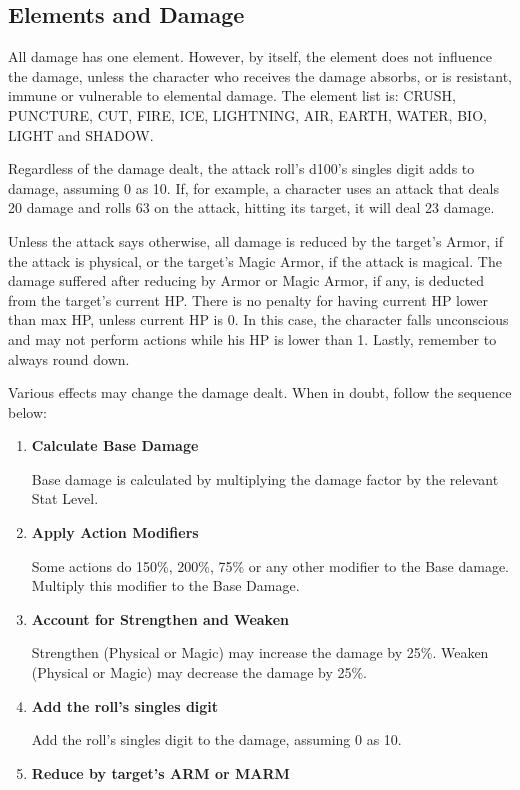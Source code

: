 \begin{multicols}{2}
\subsection{Elements and Damage}
All damage has one element. However, by
itself, the element does not influence the damage,
unless the character who receives the damage
absorbs, or is resistant, immune or vulnerable to
elemental damage. The element list is: CRUSH,
PUNCTURE, CUT, FIRE, ICE, LIGHTNING, AIR,
EARTH, WATER, BIO, LIGHT and SHADOW.

Regardless of the damage dealt, the attack
roll’s d100’s singles digit adds to damage,
assuming 0 as 10. If, for example, a character uses
an attack that deals 20 damage and rolls 63 on the
attack, hitting its target, it will deal 23 damage.

Unless the attack says otherwise, all
damage is reduced by the target's Armor, if the
attack is physical, or the target’s Magic Armor, if
the attack is magical. The damage suffered after
reducing by Armor or Magic Armor, if any, is
deducted from the target’s current HP. There is no
penalty for having current HP lower than max HP,
unless current HP is 0. In this case, the character
falls unconscious and may not perform actions
while his HP is lower than 1. Lastly, remember to
always round down.

Various effects may change the damage
dealt. When in doubt, follow the sequence below:
\begin{enumerate}
\item \textbf{Calculate Base Damage}

Base damage is calculated by multiplying the
damage factor by the relevant Stat Level.

\item \textbf{Apply Action Modifiers}

Some actions do 150\%, 200\%, 75\% or any
other modifier to the Base damage. Multiply this
modifier to the Base Damage.

\item \textbf{Account for Strengthen and Weaken}

Strengthen (Physical or Magic) may increase
the damage by 25\%. Weaken (Physical or Magic)
may decrease the damage by 25\%.

\item \textbf{Add the roll's singles digit}

Add the roll's singles digit to the damage,
assuming 0 as 10.

\item \textbf{Reduce by target's ARM or MARM}


\end{enumerate}
\end{multicols}

